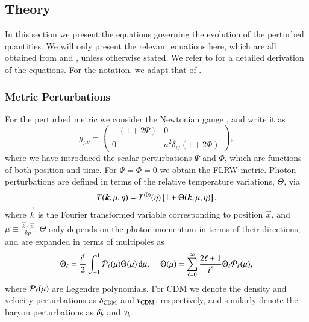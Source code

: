 \subsection{Theory}\label{ssec:M3:theory}
In this section we present the equations governing the evolution of the perturbed quantities. We will only present the relevant equations here, which are all obtained from \cite{Dodelson} and \cite{callin}, unless otherwise stated. We refer to \citeauthor{Dodelson} for a detailed derivation of the equations. For the notation, we adapt that of \citeauthor{callin}. 

\subsubsection{Metric Perturbations}\label{sssec:M3:theory:perturbations}
For the perturbed metric we consider the Newtonian gauge , and write it as  
\begin{equation}
    g_{\mu\nu} = 
    \begin{pmatrix}
        -(1+2\Psi) & 0 \\
        0 & a^2 \delta_{ij}(1+2\Phi)
    \end{pmatrix},
\end{equation}
where we have introduced the scalar perturbations $\Psi$ and $\Phi$, which are functions of both position and time. For $\Psi=\Phi=0$ we obtain the FLRW metric. Photon perturbations are defined in terms of the relative temperature variations, $\Theta$, via 
\begin{equation} \label{eq:M3:theory:temperature_fluctuations}
    T(\boldsymbol{k},\mu,\eta) = T^{(0)}(\eta)\left[ 1 + \Theta(\boldsymbol{k},\mu,\eta) \right],
\end{equation}  
where $\vec{k}$ is the Fourier transformed variable corresponding to position $\vec{x}$, and $\mu\equiv \frac{\vec{k}\cdot\vec{p}}{kp}$. $\Theta$ only depends on the photon momentum in terms of their directions, and are expanded in terms of multipoles as 
\begin{equation} \label{eq:M3:theory:theta_ell_multipolse_expansion}
    \Theta_\ell = \frac{i^\ell}{2}\int_{-1}^1 \mathcal{P}_\ell(\mu)\Theta(\mu)\,\dd\mu,\,\quad \Theta(\mu) = \sum_{\ell=0}^{\infty}\frac{2\ell+1}{i^\ell}\Theta_\ell \mathcal{P}_\ell(\mu),
\end{equation}
where $\mathcal{P}_\ell(\mu)$ are Legendre polynomials.  For CDM we denote the density and velocity perturbations as $\delta_\mathrm{CDM}$ and $v_\mathrm{CDM}$, respectively, and similarly denote the baryon perturbations as $\delta_b$ and $v_b$.  

